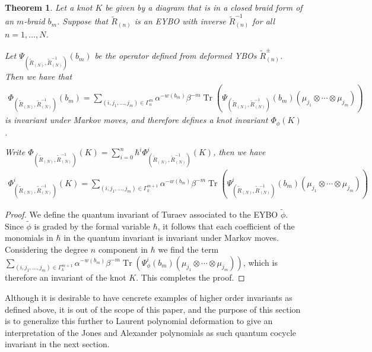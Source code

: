 \documentclass[11pt,fleqn]{amsart} %
\DeclareMathOperator{\tr}{Tr}
\newtheorem{theorem}{Theorem}[section]
\begin{document}
\begin{theorem}\label{thm:higher}
Let a knot $K$ be given by a diagram  that is in a closed braid form of an $m$-braid $b_m$. Suppose that $\tilde R_{(n)}$ is an EYBO with inverse $\tilde R^{-1}_{(n)} $
for all $n=1, \ldots, N$. 

Let $\Psi_{ (\tilde R_{(N)}, \tilde R^{-1}_{(N)} ) } (b_m) $ %
 be the operator defined from deformed YBOs $\tilde R^{\pm}_{(n)} $. Then we have that
\begin{eqnarray}
				\Phi_{ (\tilde R_{(N)}, \tilde R^{-1}_{(N)} )  } (b_m) = 	\sum_{(i,j_1,\ldots,j_m)\in \Gamma^m_n}  \alpha^{-w(b_m)}\beta^{-m}\tr(\Psi_{ (\tilde R_{(N)}, \tilde R^{-1}_{(N)}) } (b_m)(\mu_{j_1}\otimes \cdots \otimes \mu_{j_m}))
		\end{eqnarray}
is invariant under Markov moves, and therefore defines a knot invariant  $\Phi_\phi (K)$.

Write $	\Phi_{ (\tilde R_{(N)}, \tilde R^{-1}_{(N)} )  }  (K) = 	\sum_{i=0}^n \hbar^i \Phi^i_{ (\tilde R_{(N)}, \tilde R^{-1}_{(N)} )  } (K) $, then we have
	\begin{eqnarray}
			\Phi^i_{ (\tilde R_{(N)}, \tilde R^{-1}_{(N)} )  } (K)=	\sum_{(i,j_1,\ldots, j_m)\in \Gamma^{m+1}_k} \alpha^{-w(b_m)}\beta^{-m}\tr(\Psi^i_{ (\tilde R_{(N)}, \tilde R^{-1}_{(N)} )  } (b_m)(\mu_{j_1}\otimes \cdots \otimes \mu_{j_m}))
		\end{eqnarray}

\end{theorem}

\begin{proof}
We define the quantum invariant of Turaev \cite{Tur} associated to the EYBO $\tilde \phi$. Since $\tilde \phi$ is graded by the formal variable $\hbar$, it follows that each coefficient of the monomials in $\hbar$ in the quantum invariant is invariant  under Markov moves. Considering the degree $n$ component in $\hbar$ we find the term $\sum_{(i,j_1,\ldots, j_m)\in \Gamma^{m+1}_k} \alpha^{-w(b_m)}\beta^{-m}\tr(\Psi^i_\phi(b_m)(\mu_{j_1}\otimes \cdots \otimes \mu_{j_m}))$, which is therefore an 
 invariant of the knot 
$K$.			This completes the proof.
\end{proof}

 Although it is desirable to have cencrete examples of higher order invariants as defined above, it is out of the scope of this paper, and the purpose of this section is to generalize this further to Laurent polynomial deformation to 
give an interpretation of the Jones and Alexander polynomials as such quantum cocycle invariant in the next section.
\end{document}

